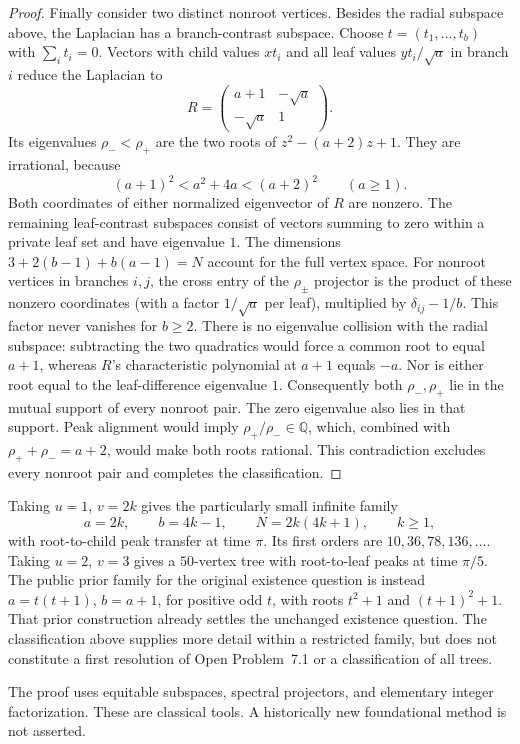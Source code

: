 \documentclass[11pt,a4paper]{article}
\theoremstyle{definition}\newtheorem{definition}[theorem]{Definition}
\theoremstyle{remark}\newtheorem{remark}[theorem]{Remark}
\begin{document}
\begin{proof}
Finally consider two distinct nonroot vertices. Besides the radial
subspace above, the Laplacian has a branch-contrast subspace. Choose
$t=(t_1,\ldots,t_b)$ with $\sum_i t_i=0$. Vectors with child values
$xt_i$ and all leaf values $yt_i/\sqrt a$ in branch $i$ reduce the
Laplacian to
\[
 R=\begin{pmatrix}a+1&-\sqrt a\\-\sqrt a&1\end{pmatrix}.
\]
Its eigenvalues $\rho_-<\rho_+$ are the two roots of
$z^2-(a+2)z+1$. They are irrational, because
\[
 (a+1)^2<a^2+4a<(a+2)^2\qquad(a\geq1).
\]
Both coordinates of either normalized eigenvector of $R$ are nonzero.
The remaining leaf-contrast subspaces consist of vectors summing to zero
within a private leaf set and have eigenvalue $1$. The dimensions
$3+2(b-1)+b(a-1)=N$ account for the full vertex space.
For nonroot vertices in branches $i,j$, the cross entry of the
$\rho_\pm$ projector is the product of these nonzero coordinates
(with a factor $1/\sqrt a$ per leaf), multiplied by
$\delta_{ij}-1/b$. This factor never vanishes for $b\geq2$.
There is no eigenvalue collision with the radial subspace: subtracting
the two quadratics would force a common root to equal $a+1$, whereas
$R$'s characteristic polynomial at $a+1$ equals $-a$.
Nor is either root equal to the leaf-difference eigenvalue $1$.
Consequently both $\rho_-,\rho_+$ lie in the mutual support of every
nonroot pair. The zero eigenvalue also lies in that support.
Peak alignment would imply $\rho_+/\rho_-\in\mathbb Q$, which,
combined with $\rho_++\rho_-=a+2$, would make both roots rational.
This contradiction excludes every nonroot pair and completes the
classification.
\end{proof}

Taking $u=1$, $v=2k$ gives the particularly small infinite family
\[
 a=2k,\qquad b=4k-1,\qquad N=2k(4k+1),\qquad k\geq1,
\]
with root-to-child peak transfer at time $\pi$. Its first orders are
$10,36,78,136,\ldots$. Taking $u=2$, $v=3$ gives a $50$-vertex tree
with root-to-leaf peaks at time $\pi/5$. The public prior family for
the original existence question is instead $a=t(t+1)$,
$b=a+1$, for positive odd $t$, with roots $t^2+1$ and $(t+1)^2+1$.
That prior construction already settles the unchanged existence
question. The classification above supplies more detail within a
restricted family, but does not constitute a first resolution of
Open Problem~7.1 or a classification of all trees.

The proof uses equitable subspaces, spectral projectors, and elementary
integer factorization. These are classical tools. A historically new
foundational method is not asserted.
\end{document}
